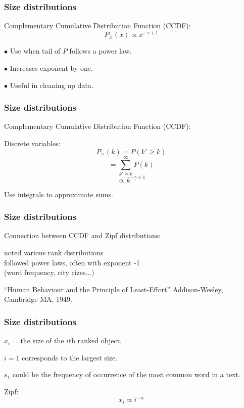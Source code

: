 \begin{frame}
  \frametitle{Size distributions}

Complementary Cumulative Distribution Function (CCDF):
$$ P_{\ge}(x) \propto x^{-\gamma+1} $$

$\bullet$ Use when tail of $P$ follows a power law.

$\bullet$ Increases exponent by one.

$\bullet$ Useful in cleaning up data.




\end{frame}

\begin{frame}
  \frametitle{Size distributions}

Complementary Cumulative Distribution Function (CCDF):

Discrete variables:
$$ P_\ge(k) = P(k' \ge k) $$
$$ = \sum_{k'=k}^{\infty} P(k) $$
$$ \propto k^{-\gamma+1} $$

Use integrals to approximate sums.

\end{frame}

\begin{frame}
  \frametitle{Size distributions}

Connection between CCDF and Zipf distributions:

noted various rank distributions\\ 
followed power laws, often with exponent -1\\
(word frequency, city cizes...)

``Human Behaviour and the Principle of Least-Effort''
{\small Addison-Wesley, Cambridge MA, 1949.}

\end{frame}

\begin{frame}
  \frametitle{Size distributions}

$x_i$ = the size of the $i$th ranked object.

\inv
$i=1$ corresponds to the largest size.

$s_1$ could be the frequency of occurrence of
the most common word in a text.

Zipf:
$$ x_i \propto i^{-\alpha} $$

\end{frame}

